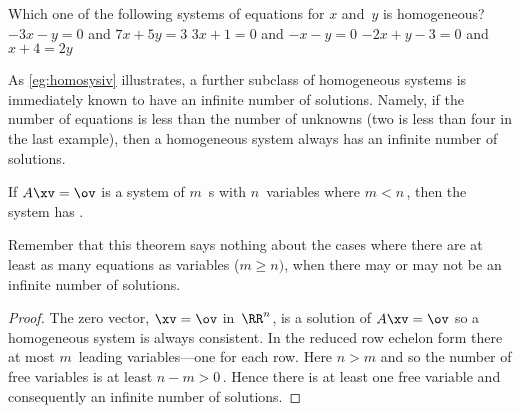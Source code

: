\begin{activity}
Which one of the following systems of equations for \(x\) and~\(y\) is homogeneous?
{\(-3x-y=0\) and \(7x+5y=3\)}
{\(3x+1=0\) and \(-x-y=0\)}
{\(-2x+y-3=0\) and \(x+4=2y\)}
\end{activity}





As \autoref{eg:homosysiv} illustrates, a further subclass of homogeneous systems is immediately known to have an infinite number of solutions.
Namely, if the number of equations is less than the number of unknowns (two is less than four in the last example), then a homogeneous system always has an infinite number of solutions.


\begin{theorem} \label{thm:feweqns} 
If \(A\xv=\ov\) is a  system of \(m\)~s with \(n\)~variables where \(m<n\)\,, then the system has .
\end{theorem}

Remember that this theorem says nothing about the cases where there are at least as many equations as variables (\(m\geq n)\), when there may or may not be an infinite number of solutions.

\begin{proof} 
The zero vector, \(\xv=\ov\) in~\(\RR^n\), is a solution of \(A\xv=\ov\) so a homogeneous system is always consistent.
In the reduced row echelon form there at most \(m\)~leading variables---one for each row.
Here \(n>m\) and so the number of free variables is at least \(n-m>0\)\,.
Hence there is at least one free variable and consequently an infinite number of solutions.
\end{proof}




